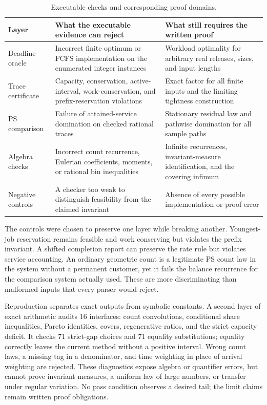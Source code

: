 \begin{table}[t]
\centering
\small
\caption{Executable checks and corresponding proof domains.}\label{tab:check-boundary}
\begin{tabular}{@{}L{0.22\textwidth}L{0.34\textwidth}L{0.34\textwidth}@{}}
\toprule
Layer & What the executable evidence can reject & What still requires the written proof\\
\midrule
Deadline oracle & Incorrect finite optimum or FCFS implementation on the enumerated integer instances & Workload optimality for arbitrary real releases, sizes, and input lengths\\
Trace certificate & Capacity, conservation, active-interval, work-conservation, and prefix-reservation violations & Exact factor for all finite inputs and the limiting tightness construction\\
PS comparison & Failure of attained-service domination on checked rational traces & Stationary residual law and pathwise domination for all sample paths\\
Algebra checks & Incorrect count recurrence, Eulerian coefficients, moments, or rational bin inequalities & Infinite recurrences, invariant-measure identification, and the covering infimum\\
Negative controls & A checker too weak to distinguish feasibility from the claimed invariant & Absence of every possible implementation or proof error\\
\bottomrule
\end{tabular}
\end{table}

The controls were chosen to preserve one layer while breaking another.  Youngest-job reservation remains feasible and work conserving but violates the prefix invariant.  A shifted completion report can preserve the rate rule but violates service accounting.  An ordinary geometric count is a legitimate PS count law in the system without a permanent customer, yet it fails the balance recurrence for the comparison system actually used.  These are more discriminating than malformed inputs that every parser would reject.

Reproduction separates exact outputs from symbolic constants.  A second layer of exact arithmetic audits 16 interfaces: count convolutions, conditional share inequalities, Pareto identities, covers, regenerative ratios, and the strict capacity deficit.  It checks 71 strict-gap choices and 71 equality substitutions; equality correctly leaves the current method without a positive interval.  Wrong count laws, a missing tag in a denominator, and time weighting in place of arrival weighting are rejected.  These diagnostics expose algebra or quantifier errors, but cannot prove invariant measures, a uniform law of large numbers, or transfer under regular variation.  No pass condition observes a desired tail; the limit claims remain written proof obligations.

